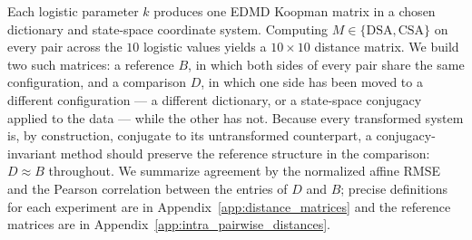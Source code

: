 \documentclass{article}
\theoremstyle{definition}
\begin{document}
Each logistic parameter $k$ produces one EDMD Koopman matrix in a chosen dictionary and state-space coordinate system. Computing $M\in\{\mathrm{DSA},\mathrm{CSA}\}$ on every pair across the $10$ logistic values yields a $10\times 10$ distance matrix. We build two such matrices: a reference $B$, in which both sides of every pair share the same configuration, and a comparison $D$, in which one side has been moved to a different configuration --- a different dictionary, or a state-space conjugacy applied to the data --- while the other has not. Because every transformed system is, by construction, conjugate to its untransformed counterpart, a conjugacy-invariant method should preserve the reference structure in the comparison: $D\approx B$ throughout. We summarize agreement by the normalized affine RMSE and the Pearson correlation between the entries of $D$ and $B$; precise definitions for each experiment are in Appendix~\ref{app:distance_matrices} and the reference matrices are in Appendix~\ref{app:intra_pairwise_distances}.
\end{document}
